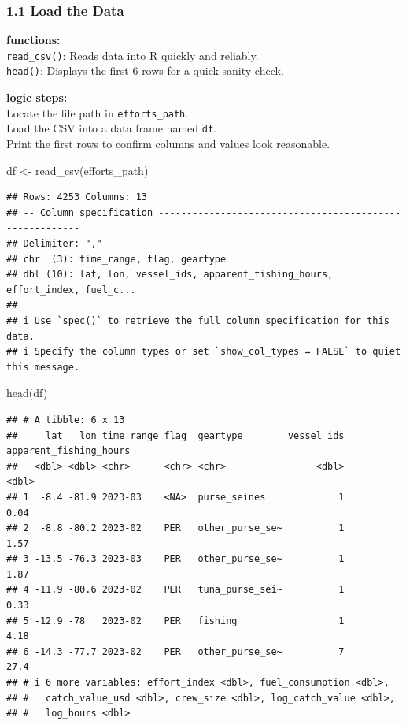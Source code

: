 \documentclass[
]{article}
\newenvironment{Shaded}{\begin{snugshade}}{\end{snugshade}}
\newcommand{\FunctionTok}[1]{\textcolor[rgb]{0.00,0.00,0.00}{#1}}
\newcommand{\NormalTok}[1]{#1}
\newcommand{\OtherTok}[1]{\textcolor[rgb]{0.56,0.35,0.01}{#1}}
\begin{document}
\hypertarget{load-the-data}{%
\subsubsection{1.1 Load the Data}\label{load-the-data}}

\textbf{functions:}\\
\texttt{read\_csv()}: Reads data into R quickly and reliably.\\
\texttt{head()}: Displays the first 6 rows for a quick sanity check.

\textbf{logic steps:}\\
Locate the file path in \texttt{efforts\_path}.\\
Load the CSV into a data frame named \texttt{df}.\\
Print the first rows to confirm columns and values look reasonable.

\begin{Shaded}
\begin{Highlighting}[]
\NormalTok{df }\OtherTok{\textless{}{-}} \FunctionTok{read\_csv}\NormalTok{(efforts\_path)}
\end{Highlighting}
\end{Shaded}

\begin{verbatim}
## Rows: 4253 Columns: 13
## -- Column specification --------------------------------------------------------
## Delimiter: ","
## chr  (3): time_range, flag, geartype
## dbl (10): lat, lon, vessel_ids, apparent_fishing_hours, effort_index, fuel_c...
## 
## i Use `spec()` to retrieve the full column specification for this data.
## i Specify the column types or set `show_col_types = FALSE` to quiet this message.
\end{verbatim}

\begin{Shaded}
\begin{Highlighting}[]
\FunctionTok{head}\NormalTok{(df)}
\end{Highlighting}
\end{Shaded}

\begin{verbatim}
## # A tibble: 6 x 13
##     lat   lon time_range flag  geartype        vessel_ids apparent_fishing_hours
##   <dbl> <dbl> <chr>      <chr> <chr>                <dbl>                  <dbl>
## 1  -8.4 -81.9 2023-03    <NA>  purse_seines             1                   0.04
## 2  -8.8 -80.2 2023-02    PER   other_purse_se~          1                   1.57
## 3 -13.5 -76.3 2023-03    PER   other_purse_se~          1                   1.87
## 4 -11.9 -80.6 2023-02    PER   tuna_purse_sei~          1                   0.33
## 5 -12.9 -78   2023-02    PER   fishing                  1                   4.18
## 6 -14.3 -77.7 2023-02    PER   other_purse_se~          7                  27.4 
## # i 6 more variables: effort_index <dbl>, fuel_consumption <dbl>,
## #   catch_value_usd <dbl>, crew_size <dbl>, log_catch_value <dbl>,
## #   log_hours <dbl>
\end{verbatim}
\end{document}
